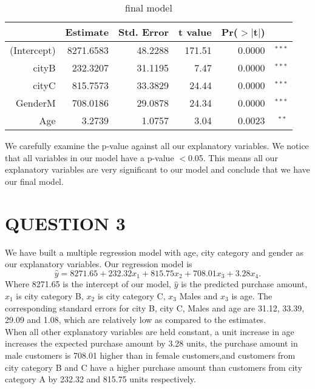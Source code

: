 \documentclass[12pt,a4paper]{article}
\begin{document}
\begin{table}[H]
\centering
\begin{tabular}{rrrrrr}
  \hline
 & Estimate & Std. Error & t value & Pr($>$$|$t$|$) \\ 
  \hline
(Intercept) & 8271.6583 & 48.2288 & 171.51 & 0.0000& $^{***}$ \\ 
  cityB & 232.3207 & 31.1195 & 7.47 & 0.0000& $^{***}$ \\ 
  cityC & 815.7573 & 33.3829 & 24.44 & 0.0000& $^{***}$ \\ 
  GenderM & 708.0186 & 29.0878 & 24.34 & 0.0000 & $^{***}$\\ 
  Age & 3.2739 & 1.0757 & 3.04 & 0.0023 & $^{**}$\\ 
   \hline
\end{tabular}
\caption{final model}
\end{table}
We carefully examine the p-value against all our explanatory variables. We notice that all variables in our model have a p-value $<$0.05. This means all our explanatory variables are very significant to our model and conclude that we have our final model.
\section*{QUESTION 3}
We have built a multiple regression model with age, city category and gender as our explanatory variables. Our regression model is $$ \hat{y}=8271.65+232.32\text{$x_1$}+815.75\text{$x_2$}
+708.01\text{$x_3$}+3.28\text{$x_4$}.$$
Where 8271.65 is the intercept of our model, $ \hat{y}$ is the predicted purchase amount, $x_1$ is city category B, $x_2$ is city category C, $x_3$ Males and $x_3$ is age. The corresponding standard errors for city B, city C, Males and age are 31.12, 33.39, 29.09 and 1.08, which are relatively low as compared to the estimates.\\
When all other explanatory variables are held constant, a unit increase in age increases the expected purchase amount by 3.28 units, the purchase amount in male customers is 708.01 higher than in female customers,and customers from city category B and C have a higher purchase amount than customers from city category A by 232.32 and 815.75 units respectively.
\end{document}
